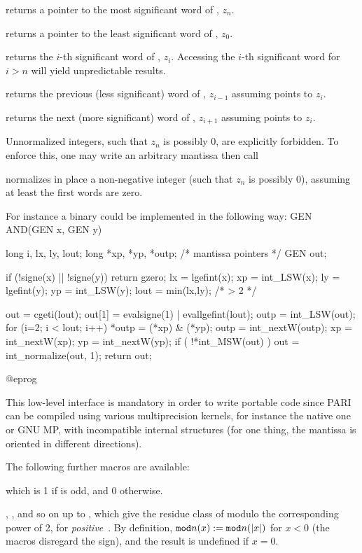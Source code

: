  returns a pointer to the most significant word of
, $z_n$.

 returns a pointer to the least significant word of
, $z_0$.

 returns the $i$-th significant word of
, $z_i$. Accessing the $i$-th significant word for $i > n$
will yield unpredictable results.

 returns the previous (less significant) word of
, $z_{i-1}$ assuming  points to $z_i$.

 returns the next (more significant) word of ,
$z_{i+1}$ assuming  points to $z_i$.

Unnormalized integers, such that $z_n$ is possibly $0$, are explicitly
forbidden. To enforce this, one may write an arbitrary mantissa then call

 normalizes in place a
non-negative integer (such that $z_n$ is possibly $0$), assuming at least the
first  words are zero.

\noindent For instance a binary  could be implemented in the 
following way:
\bprog
GEN AND(GEN x, GEN y) {
  long i, lx, ly, lout;
  long *xp, *yp, *outp; /* mantissa pointers */
  GEN out;

  if (!signe(x) || !signe(y)) return gzero;
  lx = lgefint(x); xp = int_LSW(x);
  ly = lgefint(y); yp = int_LSW(y); lout = min(lx,ly); /* > 2 */
  
  out = cgeti(lout); out[1] = evalsigne(1) | evallgefint(lout);
  outp = int_LSW(out);
  for (i=2; i < lout; i++)
  {
    *outp = (*xp) & (*yp);
    outp  = int_nextW(outp);
    xp    = int_nextW(xp);
    yp    = int_nextW(yp);
  }
  if ( !*int_MSW(out) ) out = int_normalize(out, 1);
  return out;
}
@eprog

\noindent This low-level interface is mandatory in order to write portable
code since PARI can be compiled using various multiprecision kernels, for
instance the native one or GNU MP, with incompatible internal structures
(for one thing, the mantissa is oriented in different directions).

\noindent The following further macros are available:

 which is 1 if  is odd, and 0 otherwise.

, , and so on up to ,
which give the residue class of  modulo the corresponding power of
2, for \emph{positive}~. By definition, ${\tt mod}n(x) :=
{\tt mod}n(|x|)$ for $x < 0$ (the macros disregard the sign), and the
result is undefined if $x = 0$.

